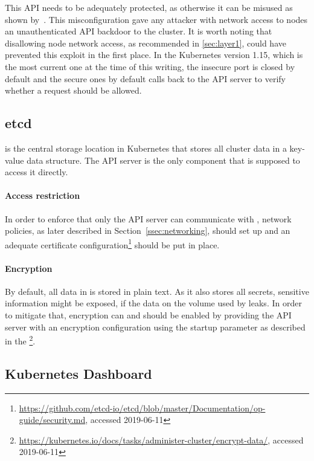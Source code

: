 This API needs to be adequately protected, as otherwise it can be misused as shown by~\textcite{kubeletBackdoor}. This misconfiguration gave any attacker with network access to nodes an unauthenticated API backdoor to the cluster. It is worth noting that disallowing node network access, as recommended in \ref{sec:layer1}, could have prevented this exploit in the first place. In the Kubernetes version 1.15, which is the most current one at the time of this writing, the insecure port is closed by default and the secure ones by default calls back to the API server to verify whether a request should be allowed. 

\subsection{etcd}\label{ssec:etcd}

 is the central storage location in Kubernetes that stores all cluster data in a key-value data structure. The API server is the only component that is supposed to access it directly.

\paragraph{Access restriction}
In order to enforce that only the API server can communicate with , network policies, as later described in Section~\ref{ssec:networking}, should set up and an adequate certificate configuration\footnote{\url{https://github.com/etcd-io/etcd/blob/master/Documentation/op-guide/security.md}, accessed 2019-06-11} should be put in place.

\paragraph{Encryption}
By default, all data in  is stored in plain text. As it also stores all secrets, sensitive information might be exposed, if the data on the volume used by  leaks. In order to mitigate that, encryption can and should be enabled by providing the API server with an encryption configuration using the startup parameter  as described in the \textcite{k8sdocs}\footnote{\url{https://kubernetes.io/docs/tasks/administer-cluster/encrypt-data/}, accessed 2019-06-11}. %


\subsection{Kubernetes Dashboard}

